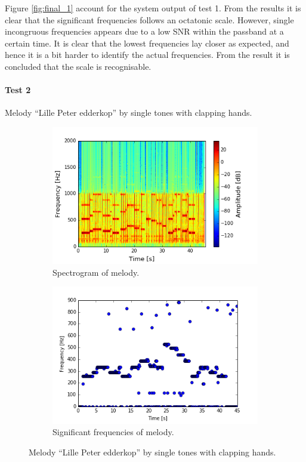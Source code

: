 Figure \ref{fig:final_1} account for the system output of test 1. From the results it is clear that the significant frequencies follows an octatonic scale. However, single incongruous frequencies appears due to a low SNR within the passband at a certain time.
It is clear that the lowest frequencies lay closer as expected, and hence it is a bit harder to identify the actual frequencies. From the result it is concluded that the scale is recognisable.

\paragraph{Test 2} Melody ``Lille Peter edderkop'' by single tones with clapping hands.  
\begin{figure}[H]
\centering
\begin{subfigure}{0.49\textwidth}
\centering
\includegraphics[width=\textwidth]{figures/validation/systemtest/final_spec2.png}
\caption{Spectrogram of melody.}
\label{fig:final_spec2}
\end{subfigure}
\begin{subfigure}{0.49\textwidth}
\centering
\includegraphics[width=\textwidth]{figures/validation/systemtest/final_peak2.png}
\caption{Significant frequencies of melody.}
\label{fig:final_peak3}
\end{subfigure}
\caption{Melody ``Lille Peter edderkop'' by single tones with clapping hands.}
\label{fig:final_3}
\end{figure}  

